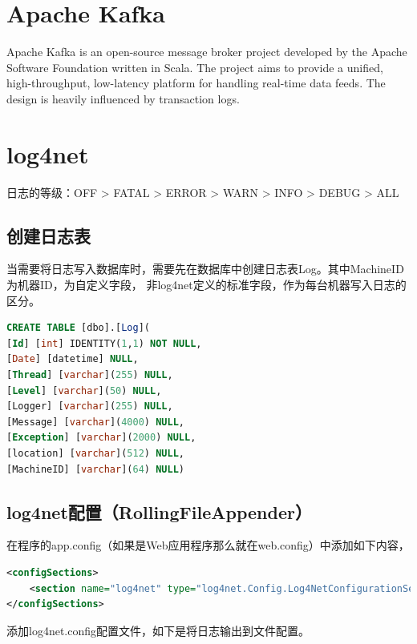 \documentclass{book}
\begin{document}
\section{Apache Kafka}

Apache Kafka is an open-source message broker project 
developed by the Apache Software Foundation written in Scala. 
The project aims to provide a unified, high-throughput, 
low-latency platform for handling real-time data feeds. 
The design is heavily influenced by transaction logs.

\section{log4net}

日志的等级：OFF > FATAL > ERROR > WARN > INFO > DEBUG  > ALL

\subsection{创建日志表}

当需要将日志写入数据库时，需要先在数据库中创建日志表Log。其中MachineID为机器ID，为自定义字段，
非log4net定义的标准字段，作为每台机器写入日志的区分。

\begin{lstlisting}[language=SQL]
CREATE TABLE [dbo].[Log](	
[Id] [int] IDENTITY(1,1) NOT NULL,
[Date] [datetime] NULL,
[Thread] [varchar](255) NULL,	
[Level] [varchar](50) NULL,	
[Logger] [varchar](255) NULL,
[Message] [varchar](4000) NULL,	
[Exception] [varchar](2000) NULL,	
[location] [varchar](512) NULL,
[MachineID] [varchar](64) NULL)
\end{lstlisting}

\subsection{log4net配置（RollingFileAppender）}

在程序的app.config（如果是Web应用程序那么就在web.config）中添加如下内容，

\begin{lstlisting}[language=XML]
<configSections>    
	<section name="log4net" type="log4net.Config.Log4NetConfigurationSectionHandler, log4net"/>
</configSections>
\end{lstlisting}

添加log4net.config配置文件，如下是将日志输出到文件配置。
\end{document}
